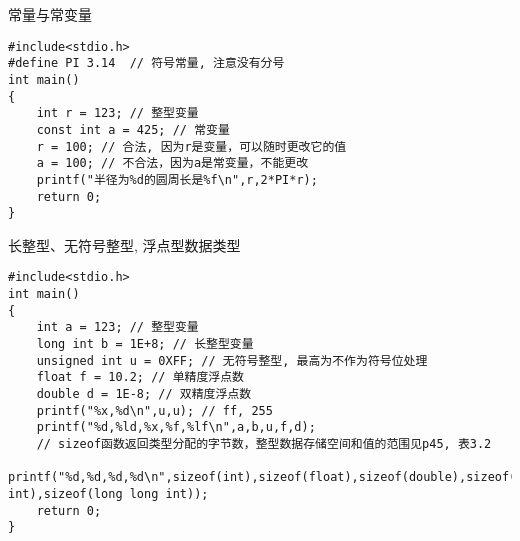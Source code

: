 \begin{frame}[fragile]{常量与常变量}
\begin{lstlisting}
#include<stdio.h> 
#define PI 3.14  // 符号常量, 注意没有分号           
int main()                   
{                            
	int r = 123; // 整型变量
	const int a = 425; // 常变量
	r = 100; // 合法, 因为r是变量，可以随时更改它的值
	a = 100; // 不合法，因为a是常变量，不能更改
	printf("半径为%d的圆周长是%f\n",r,2*PI*r); 
	return 0;           
}                            
\end{lstlisting}
\end{frame}

\begin{frame}{长整型、无符号整型, 浮点型数据类型}
\begin{lstlisting}
#include<stdio.h>           
int main()                   
{                            
	int a = 123; // 整型变量
	long int b = 1E+8; // 长整型变量
	unsigned int u = 0XFF; // 无符号整型, 最高为不作为符号位处理
	float f = 10.2; // 单精度浮点数
	double d = 1E-8; // 双精度浮点数
	printf("%x,%d\n",u,u); // ff, 255
	printf("%d,%ld,%x,%f,%lf\n",a,b,u,f,d);
	// sizeof函数返回类型分配的字节数，整型数据存储空间和值的范围见p45, 表3.2
	printf("%d,%d,%d,%d\n",sizeof(int),sizeof(float),sizeof(double),sizeof(long int),sizeof(long long int));
	return 0;           
}                            
\end{lstlisting}
\end{frame}



